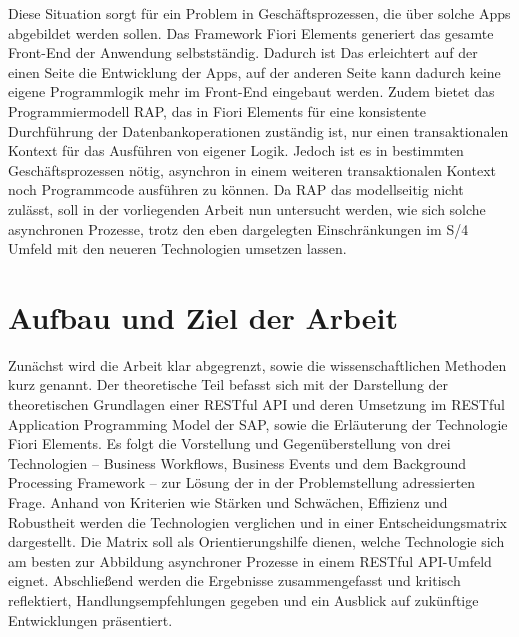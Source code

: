 Diese Situation sorgt für ein Problem in Geschäftsprozessen, die über solche Apps abgebildet werden sollen. Das Framework Fiori Elements generiert das gesamte Front-End der Anwendung selbstständig. Dadurch ist Das erleichtert auf der einen Seite die Entwicklung der Apps, auf der anderen Seite kann dadurch keine eigene Programmlogik mehr im Front-End eingebaut werden. Zudem bietet das Programmiermodell RAP, das in Fiori Elements für eine konsistente Durchführung der Datenbankoperationen zuständig ist, nur einen transaktionalen Kontext für das Ausführen von eigener Logik. Jedoch ist es in bestimmten Geschäftsprozessen nötig, asynchron in einem weiteren transaktionalen Kontext noch Programmcode ausführen zu können. Da RAP das modellseitig nicht zulässt, soll in der vorliegenden Arbeit nun untersucht werden, wie sich solche asynchronen Prozesse, trotz den eben dargelegten Einschränkungen im S/4 Umfeld mit den neueren Technologien umsetzen lassen.


\section{Aufbau und Ziel der Arbeit}

Zunächst wird die Arbeit klar abgegrenzt, sowie die wissenschaftlichen Methoden kurz genannt. Der theoretische Teil befasst sich mit der Darstellung der theoretischen Grundlagen einer RESTful API und deren Umsetzung im RESTful Application Programming Model der SAP, sowie die Erläuterung der Technologie Fiori Elements. Es folgt die Vorstellung und Gegenüberstellung von drei Technologien – Business Workflows, Business Events und dem Background Processing Framework – zur Lösung der in der Problemstellung adressierten Frage. Anhand von Kriterien wie Stärken und Schwächen, Effizienz und Robustheit werden die Technologien verglichen und in einer Entscheidungsmatrix dargestellt. Die Matrix soll als Orientierungshilfe dienen, welche Technologie sich am besten zur Abbildung asynchroner Prozesse in einem RESTful API-Umfeld eignet. Abschlie{\ss}end werden die Ergebnisse zusammengefasst und kritisch reflektiert, Handlungsempfehlungen gegeben und ein Ausblick auf zukünftige Entwicklungen präsentiert.

